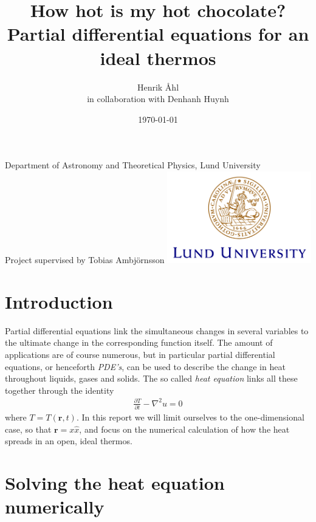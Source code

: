 \documentclass[a4paper,12pt]{article}
\title
{
	\textbf
	{
      How hot is my hot chocolate? \\Partial differential equations for an ideal
      thermos
   }
}
\author{Henrik Åhl\\
\small{in collaboration with Denhanh Huynh}}
\date{\today}
\theoremstyle{plain}
\theoremstyle{definition}
\begin{document}
\begin{titlepage}
	
   \maketitle 
	\begin{center}
		\phantom{a}
		{Department of Astronomy and Theoretical Physics, Lund University}
		\\[2cm]
		{Project supervised by Tobias Ambjörnsson}
		\vfill
		\includegraphics[height=4cm]{logocLUeng.pdf}
	\end{center}
	\thispagestyle{empty} %

\end{titlepage}

\section{Introduction}
   Partial differential equations link the simultaneous changes in several
   variables to the ultimate change in the corresponding function itself. The
   amount of applications are of course numerous, but in particular partial
   differential equations, or henceforth \emph{PDE's}, can be used to describe
   the change in heat throughout liquids, gases and solids. The so called
   \emph{heat equation} links all these together through the identity
      \begin{align*}
         \frac{\partial T}{\partial t} - \nabla^2 u = 0
      \end{align*}
   where $T = T(\mathbf r,t)$. In this report we will limit ourselves to the
   one-dimensional case, so that $\mathbf r = x\hat x$, and focus on the
   numerical calculation of how the heat spreads in an open, ideal thermos. 

\section{Solving the heat equation numerically}
	\setcounter{equation}{0}
\end{document}
